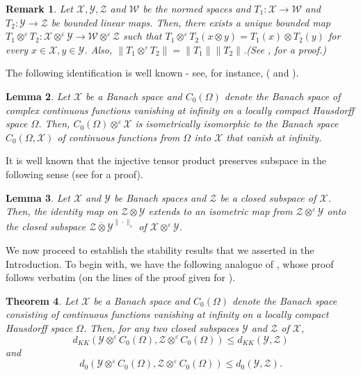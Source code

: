 \documentclass{amsart}
\numberwithin{equation}{section}
\newcommand{\mcal}{\mathcal}
\newcommand{\1}{\mathbf{1}}
\newtheorem{theorem}{Theorem}[section]
\newtheorem{lemma}[theorem]{Lemma}
\newtheorem{remark}[theorem]{Remark}
\begin{document}
\begin{remark}\label{bounded maps}
Let $\mcal{X},\mcal{Y},\mcal{Z}$ and $\mcal{W}$ be the normed spaces
and $T_{1}:\mcal{X}\rightarrow \mcal{W} $ and $T_{2}:
\mcal{Y}\rightarrow \mcal{Z}$ be bounded linear maps. Then, there
exists a unique bounded map $T_{1}\otimes^{\varepsilon} T_{2}:
\mcal{X} \otimes^{\varepsilon} \mcal{Y} \rightarrow \mcal{W}
\otimes^{\varepsilon} \mcal{Z} $ such that $T_{1}\otimes^{\varepsilon}
T_{2}(x\otimes y)= T_{1}(x)\otimes T_{2}(y)$ for every $x\in \mcal{X},
y\in \mcal{Y}$. Also, $\|T_{1}\otimes^{\varepsilon} T_{2}\|=
\|T_{1}\|\|T_{2}\|$.\hfill  (See \cite[Proposition 3.2]{R}, for a proof.)
\end{remark}

The following identification is well known - see, for instance,
(\cite[Lemma 6.4.16]{JM} and \cite[Section 3.2]{R}).

\begin{lemma}\label{identification}
Let $\mcal{X}$ be a Banach space and $C_{0}(\Omega)$ denote the Banach
space of complex continuous functions vanishing at infinity on a
locally compact Hausdorff space $\Omega$.  Then,
$C_{0}(\Omega)\otimes^{\varepsilon} \mcal{X}$ is isometrically
isomorphic to the Banach space $C_{0}(\Omega,\mcal{X})$ of continuous
functions from $\Omega$ into $\mcal{X}$ that vanish at infinity.
\end{lemma}

It is well known that the injective tensor product preserves subspace
in the following sense (see \cite{R} for a proof).
\begin{lemma}
Let $\mcal{X}$ and $\mcal{Y}$ be Banach spaces and $\mcal{Z}$ be a
closed subspace of $\mcal{X}$. Then, the identity map on $\mcal{Z}
\otimes \mcal{Y}$ extends to an isometric map from $\mcal{Z}
\otimes^{\varepsilon}\mcal{Y}$ onto the closed subspace
$\overline{\mcal{Z} \otimes \mcal{Y}}^{\|\cdot\|_{\varepsilon}}$ of
$\mcal{X}\otimes^{\varepsilon} \mcal{Y}$.
\end{lemma}

We now proceed to establish the stability results that we asserted in
the Introduction. To begin with, we have the following analogue of
\cite[Theorem 4.6]{GK2}, whose proof follows verbatim (on the lines of
the proof given for \cite[Theorem 4.6]{GK2}).

\begin{theorem}\label{reverse inequality}
Let $\mcal{X}$ be a Banach space and $C_{0}(\Omega)$ denote the Banach
space consisting of continuous functions vanishing at infinity on a
locally compact Hausdorff space $\Omega$. Then, for any two closed
subspaces $\mcal{Y}$ and $\mcal{Z}$ of $\mcal{X}$,
\[
d_{KK}\left(\mcal{Y}\otimes^{\varepsilon} C_{0}(\Omega), \mcal{Z}\otimes^{\varepsilon} C_{0}(\Omega)\right)\leq d_{KK}(\mcal{Y}, \mcal{Z})
\]
and      
\[
 d_{0}\left(\mcal{Y}\otimes^{\varepsilon} C_{0}(\Omega), \mcal{Z}\otimes^{\varepsilon} C_{0}(\Omega)\right)\leq d_{0}(\mcal{Y}, \mcal{Z}).
\]
\end{theorem}
\end{document}
